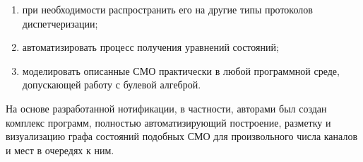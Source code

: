 \begin{enumerate}

\item при необходимости распространить его на другие типы протоколов диспетчеризации;



\item автоматизировать процесс получения уравнений состояний;



\item 	моделировать описанные СМО практически в любой программной среде, допускающей работу с булевой алгеброй.





\end{enumerate}



На основе разработанной нотификации, в частности, авторами был создан комплекс программ, полностью автоматизирующий построение, разметку и визуализацию графа состояний подобных СМО для произвольного числа каналов и мест в очередях к ним.







